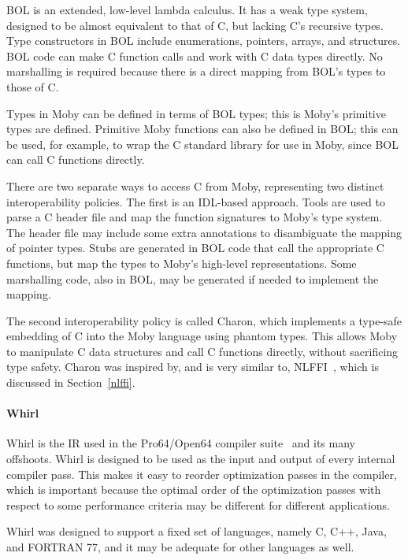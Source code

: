 BOL is an extended, low-level lambda calculus. It has a weak type system, designed to be almost equivalent to that of C, but lacking C's recursive types. Type constructors in BOL include enumerations, pointers, arrays, and structures. BOL code can make C function calls and work with C data types directly. No marshalling is required because there is a direct mapping from BOL's types to those of C.

Types in Moby can be defined in terms of BOL types; this is Moby's primitive types are defined. Primitive Moby functions can also be defined in BOL; this can be used, for example, to wrap the C standard library for use in Moby, since BOL can call C functions directly.

There are two separate ways to access C from Moby, representing two distinct interoperability policies. The first is an IDL-based approach. Tools are used to parse a C header file and map the function signatures to Moby's type system. The header file may include some extra annotations to disambiguate the mapping of pointer types. Stubs are generated in BOL code that call the appropriate C functions, but map the types to Moby's high-level representations. Some marshalling code, also in BOL, may be generated if needed to implement the mapping.

The second interoperability policy is called Charon, which implements a type-safe embedding of C into the Moby language using phantom types. This allows Moby to manipulate C data structures and call C functions directly, without sacrificing type safety. Charon was inspired by, and is very similar to, NLFFI~\cite{blume01nlffi}, which is discussed in Section~\ref{nlffi}.


\paragraph{Whirl}

Whirl is the IR used in the Pro64/Open64 compiler suite~\cite{whirl, murphy08open64, liao06openuh} and its many offshoots. Whirl is designed to be used as the input and output of every internal compiler pass. This makes it easy to reorder optimization passes in the compiler, which is important because the optimal order of the optimization passes with respect to some performance criteria may be different for different applications.

Whirl was designed to support a fixed set of languages, namely C, C++, Java, and FORTRAN 77, and it may be adequate for other languages as well.

